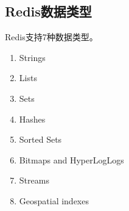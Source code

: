 \documentclass[../../../interview-questions.tex]{subfiles}
\begin{document}
\subsection{Redis数据类型}

Redis支持7种数据类型。

\begin{enumerate}
    \item {Strings}
    \item {Lists}
    \item {Sets}
    \item {Hashes}
    \item {Sorted Sets}
    \item {Bitmaps and HyperLogLogs}
    \item {Streams}
    \item {Geospatial indexes}
\end{enumerate}
\end{document}
